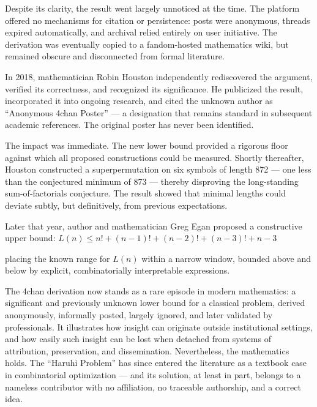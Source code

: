 Despite its clarity, the result went largely unnoticed at the time. The platform offered no mechanisms for citation or persistence: posts were anonymous, threads expired automatically, and archival relied entirely on user initiative. The derivation was eventually copied to a fandom-hosted mathematics wiki, but remained obscure and disconnected from formal literature.

In 2018, mathematician Robin Houston independently rediscovered the argument, verified its correctness, and recognized its significance. He publicized the result, incorporated it into ongoing research, and cited the unknown author as “Anonymous 4chan Poster” — a designation that remains standard in subsequent academic references. The original poster has never been identified.

The impact was immediate. The new lower bound provided a rigorous floor against which all proposed constructions could be measured. Shortly thereafter, Houston constructed a superpermutation on six symbols of length 872 — one less than the conjectured minimum of 873 — thereby disproving the long-standing sum-of-factorials conjecture. The result showed that minimal lengths could deviate subtly, but definitively, from previous expectations.

Later that year, author and mathematician Greg Egan proposed a constructive upper bound: $L(n) \leq n! + (n-1)! + (n-2)! + (n-3)! + n - 3$

placing the known range for $L(n)$ within a narrow window, bounded above and below by explicit, combinatorially interpretable expressions.

The 4chan derivation now stands as a rare episode in modern mathematics: a significant and previously unknown lower bound for a classical problem, derived anonymously, informally posted, largely ignored, and later validated by professionals. It illustrates how insight can originate outside institutional settings, and how easily such insight can be lost when detached from systems of attribution, preservation, and dissemination. Nevertheless, the mathematics holds. The “Haruhi Problem” has since entered the literature as a textbook case in combinatorial optimization — and its solution, at least in part, belongs to a nameless contributor with no affiliation, no traceable authorship, and a correct idea.
